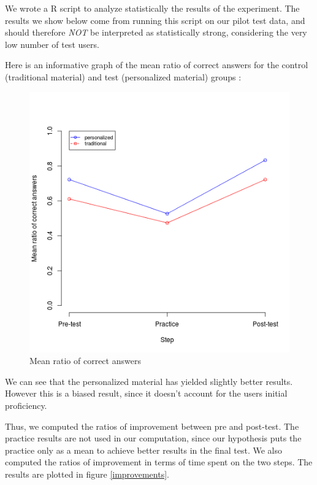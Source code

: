\documentclass[a4paper,12pt]{article}
\makeatletter
\def\maxwidth{%
  \ifdim\Gin@nat@width>\linewidth
    \linewidth
  \else
    \Gin@nat@width
  \fi
}
\makeatother
\begin{document}
We wrote a R script to analyze statistically the results of the experiment.
The results we show below come from running this script on our pilot test data, and should therefore \textit{NOT} be interpreted as statistically strong, considering the very low number of test users.

Here is an informative graph of the mean ratio of correct answers for the control (traditional material) and test (personalized material) groups :

\begin{figure}[H]
\begin{center}
\includegraphics[width=\maxwidth]{correct_answers_means.png}
\caption{Mean ratio of correct answers}
\label{means}
\end{center}
\end{figure}

We can see that the personalized material has yielded slightly better results. However this is a biased result, since it doesn't account for the users initial proficiency.

Thus, we computed the ratios of improvement between pre and post-test. The practice results are not used in our computation, since our hypothesis puts the practice only as a mean to achieve better results in the final test.
We also computed the ratios of improvement in terms of time spent on the two steps. The results are plotted in figure \ref{improvements}.
\end{document}
